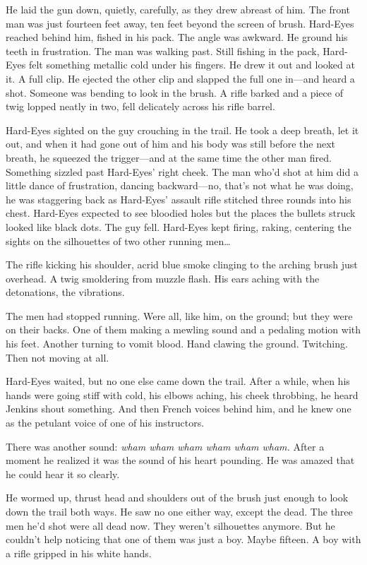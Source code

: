 He laid the gun down, quietly, carefully, as they drew abreast of him. The front man was just fourteen feet away, ten feet beyond the screen of brush. Hard-Eyes reached behind him, fished in his pack. The angle was awkward. He ground his teeth in frustration. The man was walking past. Still fishing in the pack, Hard-Eyes felt something metallic cold under his fingers. He drew it out and looked at it. A full clip. He ejected the other clip and slapped the full one in---and heard a shot. Someone was bending to look in the brush. A rifle barked and a piece of twig lopped neatly in two, fell delicately across his rifle barrel.

Hard-Eyes sighted on the guy crouching in the trail. He took a deep breath, let it out, and when it had gone out of him and his body was still before the next breath, he squeezed the trigger---and at the same time the other man fired. Something sizzled past Hard-Eyes' right cheek. The man who'd shot at him did a little dance of frustration, dancing backward---no, that's not what he was doing, he was staggering back as Hard-Eyes' assault rifle stitched three rounds into his chest. Hard-Eyes expected to see bloodied holes but the places the bullets struck looked like black dots. The guy fell. Hard-Eyes kept firing, raking, centering the sights on the silhouettes of two other running men\ldots

The rifle kicking his shoulder, acrid blue smoke clinging to the arching brush just overhead. A twig smoldering from muzzle flash. His ears aching with the detonations, the vibrations.

The men had stopped running. Were all, like him, on the ground; but they were on their backs. One of them making a mewling sound and a pedaling motion with his feet. Another turning to vomit blood. Hand clawing the ground. Twitching. Then not moving at all.

Hard-Eyes waited, but no one else came down the trail. After a while, when his hands were going stiff with cold, his elbows aching, his cheek throbbing, he heard Jenkins shout something. And then French voices behind him, and he knew one as the petulant voice of one of his instructors.

There was another sound: \textit{wham wham wham wham wham wham.} After a moment he realized it was the sound of his heart pounding. He was amazed that he could hear it so clearly.

He wormed up, thrust head and shoulders out of the brush just enough to look down the trail both ways. He saw no one either way, except the dead. The three men he'd shot were all dead now. They weren't silhouettes anymore. But he couldn't help noticing that one of them was just a boy. Maybe fifteen. A boy with a rifle gripped in his white hands.

